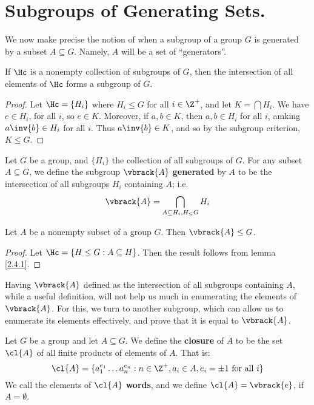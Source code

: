 \section{Subgroups of Generating Sets.}
\label{section1}

We now make precise the notion of when a subgroup of a group $G$ is generated by
a subset $A \subseteq G$. Namely, $A$ will be a set of ``generators''.

\begin{lemma}\label{2.4.1}
    If $\Hc$ is a nonempty collection of subgroups of  $G$, then the
    intersection of all elements of $\Hc$ forms a subgroup of $G$.
\end{lemma}
\begin{proof}
    Let $\Hc=\{H_i\}$ where $H_i \leq G$ for all  $i \in \Z^+$, and let
    $K=\bigcap{H_i}$. We have $e \in H_i$, for all  $i$, so  $e \in K$.
    Moreover, if  $a,b \in K$, then  $a,b \in H_i$ for all $i$, amking
    $a\inv{b} \in H_i$ for all $i$. Thus  $a\inv{b} \in K$, and so by the
    subgroup criterion, $K \leq G$.
\end{proof}

\begin{definition}
    Let $G$ be a group, and  $\{H_i\}$ the collection of all subgroups of $G$.
    For any subset  $A \subseteq G$, we define the subgroup $\vbrack{A}$
    \textbf{generated} by $A$ to be the intersection of all subgroups $H_i$
    containing  $A$; i.e.
    \begin{equation}
        \vbrack{A}=\bigcap_{A \subseteq H_i, H_ \leq G}{H_i}
    \end{equation}
\end{definition}

\begin{lemma}\label{2.4.2}
    Let $A$ be a nonempty subset of a group  $G$. Then  $\vbrack{A} \leq G$.
\end{lemma}
\begin{proof}
    Let $\Hc=\{H \leq G : A \subseteq H\}$. Then the result follows from lemma
    \ref{2.4.1}.
\end{proof}

Having $\vbrack{A}$ defined as the intersection of all subgroups containing $A$,
while a useful definition, will not help us much in enumerating the elements of
$\vbrack{A}$. For this, we turn to another subgroup, which can allow us to
enumerate its elements effectively, and prove that it is equal to $\vbrack{A}$.

\begin{definition}
    Let $G$ be a group and let  $A \subseteq G$. We define the  \textbf{closure}
    of $A$ to be the set  $\cl{A}$ of all finite products of elements of $A$.
    That is:
    \begin{equation}
        \cl{A}=\{a_1^{e_1} \dots a_n^{e_n} : n \in \Z^+, a_i \in A, e_i=\pm1
        \text{ for all } i\}
    \end{equation}
    We call the elements of $\cl{A}$ \textbf{words}, and we define
    $\cl{A}=\vbrack{e}$, if $A=\emptyset$.
\end{definition}

